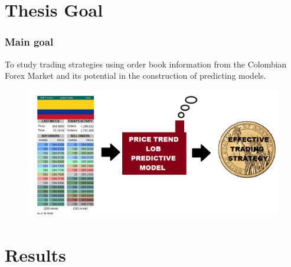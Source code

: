 \documentclass{beamer}
\begin{document}


\section{Thesis Goal} %

\begin{frame}
\frametitle{Main goal}

To study trading strategies using order book information from the Colombian Forex Market and its potential in the construction of predicting models.

\begin{figure}
	\centering
		\includegraphics[scale=0.4]{Goals1.png}
	\label{fig:Goals1}
\end{figure}


\end{frame}

\section{Results}
\end{document}
